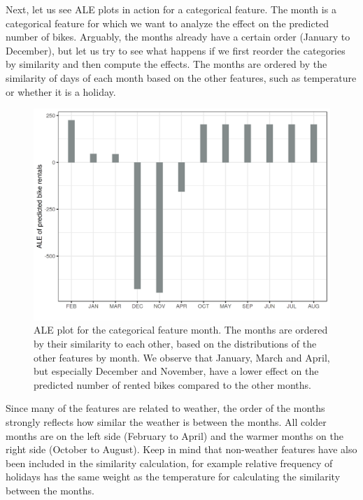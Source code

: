 \documentclass[12pt,]{krantz}
\begin{document}
Next, let us see ALE plots in action for a categorical feature. The
month is a categorical feature for which we want to analyze the effect
on the predicted number of bikes. Arguably, the months already have a
certain order (January to December), but let us try to see what happens
if we first reorder the categories by similarity and then compute the
effects. The months are ordered by the similarity of days of each month
based on the other features, such as temperature or whether it is a
holiday.

\begin{figure}

{\centering \includegraphics[width=\textwidth]{images/ale-bike-cat-1} 

}

\caption{ALE plot for the categorical feature month. The months are ordered by their similarity to each other, based on the distributions of the other features by month. We observe that January, March and April, but especially December and November, have a lower effect on the predicted number of rented bikes compared to the other months.}\label{fig:ale-bike-cat}
\end{figure}

Since many of the features are related to weather, the order of the
months strongly reflects how similar the weather is between the months.
All colder months are on the left side (February to April) and the
warmer months on the right side (October to August). Keep in mind that
non-weather features have also been included in the similarity
calculation, for example relative frequency of holidays has the same
weight as the temperature for calculating the similarity between the
months.
\end{document}
